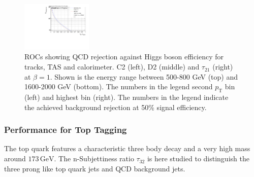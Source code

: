 \begin{figure}[htp]
\includegraphics[width=0.3\textwidth]{sascha_input/plots/Higgs/ROC/Beta1/ROC_ALL_h_recoJet_nSub21_bin5.pdf}
\caption{\footnotesize{ROCs showing QCD rejection against Higgs boson efficiency for tracks, TAS and calorimeter. C2 (left), D2 (middle) and $\tau_{21}$ (right) at $\beta=1$. Shown is the energy range between 500-800 GeV (top) and 1600-2000 GeV (bottom). The numbers in the legend second $p_{\mathrm{T}}$ bin (left) and highest bin (right). The numbers in the legend indicate the achieved background rejection at 50\% signal efficiency.}}\label{fig:ROC_higgs_nSub21}
\end{figure}

\subsubsection{Performance for Top Tagging}
The top quark features a characteristic three body decay and a very high mass around $173 \, \text{GeV}$. The n-Subjettiness ratio $\tau_{32}$ is here studied to distinguish the three prong like top quark jets and QCD background jets.

